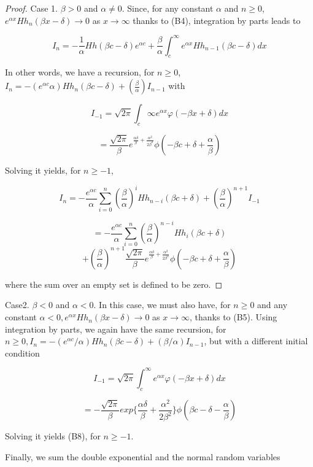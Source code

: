\begin{proof}{Case 1.}
$\beta>0$ and $\alpha\neq0$. Since, for any constant $\alpha$ and $n \geq 0$, $e^{\alpha x} Hh_{n}(\beta x - \delta) \rightarrow 0$ as $x \rightarrow \infty$ thanks to (B4), integration by parts leads to

$$I_{n}=-\frac{1}{\alpha}Hh(\beta c -\delta) e^{\alpha c} + \frac{\beta}{\alpha}\int_{c}^{\infty} e^{\alpha x} Hh_{n-1}(\beta c - \delta)dx$$

In other words, we have a recursion, for $n \geq 0$, $I_{n}=-(e^{\alpha c}{\alpha})Hh_{n}(\beta c - \delta) + (\frac{\beta}{\alpha})I_{n-1}$ with

$$I_{-1}=\sqrt{2 \pi} \int_{c}{\infty}e^{\alpha x}\varphi(-\beta x +\delta)dx$$

$$=\frac{\sqrt{2 \pi}}{\beta} e^{\frac{\alpha \delta}{\beta}+\frac{\alpha^{2}}{2 \beta^{2}}}\phi(-\beta c + \delta +\frac{\alpha}{\beta})$$

Solving it yields, for $n \geq -1$,

$$I_{n}=-\frac{e^{\alpha c}}{\alpha}\sum_{i=0}^{n}(\frac{\beta}{\alpha})^{i}Hh_{n-i}(\beta c+\delta) + (\frac{\beta}{\alpha})^{n+1}I_{-1}$$

$$=-\frac{e^{\alpha c}}{\alpha}\sum_{i=0}^{n}(\frac{\beta}{\alpha})^{n-i} Hh_{i}(\beta c+\delta)$$
$$+ (\frac{\beta}{\alpha})^{n+1}\frac{\sqrt{2 \pi}}{\beta} e^{\frac{\alpha \delta}{\beta}+\frac{\alpha^{2}}{2 \beta^{2}}}\phi(-\beta c + \delta +\frac{\alpha}{\beta})$$

where the sum over an empty set is defined to be zero.
\end{proof}

Case2. $\beta<0$ and $\alpha<0$. In this case, we must also have, for $n \geq 0$ and any constant $\alpha<0, e^{\alpha x}Hh_{n}(\beta x -\delta) \rightarrow 0$ as
$x \rightarrow \infty$, thanks to (B5). Using integration by parts, we again have the same recursion, for $n \geq 0, I_{n}=-(e^{\alpha c}/\alpha)Hh_{n}(\beta c - \delta)+(\beta / \alpha)I_{n-1}$, but with a different initial condition

$$I_{-1}=\sqrt{2 \pi}\int_{c}^{\infty}e^{\alpha x}\varphi(-\beta x + \delta)dx$$

$$=-\frac{\sqrt{2 \pi}}{\beta} exp\{\frac{\alpha \delta}{\beta}+\frac{\alpha^{2}}{2 \beta^{2}}\}\phi(\beta c - \delta -\frac{\alpha}{\beta})$$

Solving it yields (B8), for $n \geq -1$.

Finally, we sum the double exponential and the normal random variables

